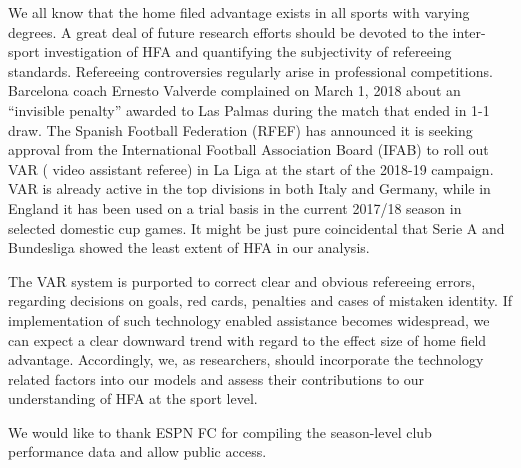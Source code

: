 \documentclass[USenglish]{article}
\begin{document}
We all know that the home filed advantage exists in all sports with varying degrees. A great deal of future research efforts should be devoted to the inter-sport investigation of HFA and quantifying the subjectivity of refereeing standards. 
Refereeing controversies regularly arise in professional competitions. Barcelona coach Ernesto Valverde complained on March 1, 2018 about an “invisible penalty” awarded to Las Palmas during the match that ended  in 1-1 draw.
The Spanish Football Federation (RFEF) has announced it is seeking approval from the International Football Association Board (IFAB) to roll out VAR ( video assistant referee)  in La Liga at the start of the 2018-19 campaign. VAR is already active in the top divisions in both Italy and Germany, while in England it has been used on a trial basis in the current 2017/18 season in selected domestic cup games. It might be just pure coincidental that Serie A and Bundesliga showed the least extent of HFA in our analysis. 

The VAR system is purported to correct clear and obvious refereeing errors, regarding decisions on goals, red cards, penalties and cases of mistaken identity. If implementation of such technology enabled assistance becomes widespread, we can expect a clear downward trend with regard to the effect size of home field advantage. Accordingly, we, as researchers, should incorporate the technology related factors into our models and assess their contributions to our understanding of HFA at the sport level.   
 

\newpage
\begin{acknowledgement}

We would like to thank ESPN FC for compiling the season-level club performance data and allow public access.

\end{acknowledgement}

\newpage

%

\end{document}
